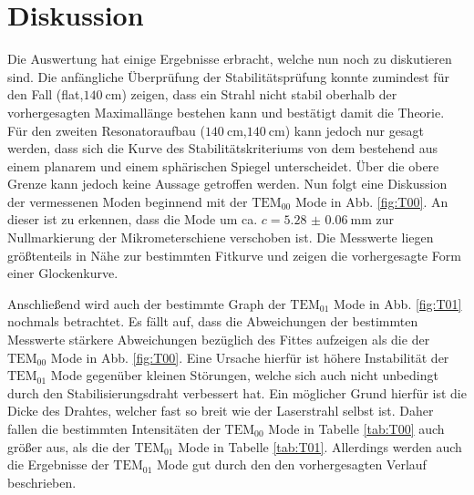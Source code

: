 
\section{Diskussion}
\label{sec:Diskussion}
Die Auswertung hat einige Ergebnisse erbracht, welche nun noch zu diskutieren sind. Die anfängliche Überprüfung der Stabilitätsprüfung konnte zumindest für den Fall (flat,$\SI{140}{\centi\meter}$) zeigen, dass ein Strahl nicht stabil oberhalb der vorhergesagten Maximallänge bestehen kann und bestätigt damit die Theorie. Für den zweiten Resonatoraufbau ($\SI{140}{\centi\meter}$,$\SI{140}{\centi\meter}$) kann jedoch nur gesagt werden, dass sich die Kurve des Stabilitätskriteriums von dem bestehend aus einem planarem und einem sphärischen Spiegel unterscheidet. Über die obere Grenze kann jedoch keine Aussage getroffen werden. %
 Nun folgt eine Diskussion der vermessenen Moden beginnend mit der $\text{TEM}_\text{00}$ Mode in Abb. \ref{fig:T00}. An dieser ist zu erkennen, dass die Mode um ca. $c = \SI{5.28(6)}{\milli\meter}$ zur Nullmarkierung der Mikrometerschiene verschoben ist. Die Messwerte liegen größtenteils in Nähe zur bestimmten Fitkurve und zeigen die vorhergesagte Form einer Glockenkurve. 
 
 Anschließend wird auch der bestimmte Graph der $\text{TEM}_\text{01}$ Mode in Abb. \ref{fig:T01} nochmals betrachtet. Es fällt auf, dass die Abweichungen der bestimmten Messwerte stärkere Abweichungen bezüglich des Fittes aufzeigen als die der $\text{TEM}_\text{00}$ Mode in Abb. \ref{fig:T00}. Eine Ursache hierfür ist höhere Instabilität der $\text{TEM}_\text{01}$ Mode gegenüber kleinen Störungen, welche sich auch nicht unbedingt durch den Stabilisierungsdraht verbessert hat. Ein möglicher Grund hierfür ist die Dicke des Drahtes, welcher fast so breit wie der Laserstrahl selbst ist. Daher fallen die bestimmten Intensitäten der $\text{TEM}_\text{00}$ Mode in Tabelle \ref{tab:T00} auch größer aus, als die der $\text{TEM}_\text{01}$ Mode in Tabelle \ref{tab:T01}.
 Allerdings werden auch die Ergebnisse der $\text{TEM}_{01}$ Mode gut durch den den vorhergesagten Verlauf beschrieben.  


